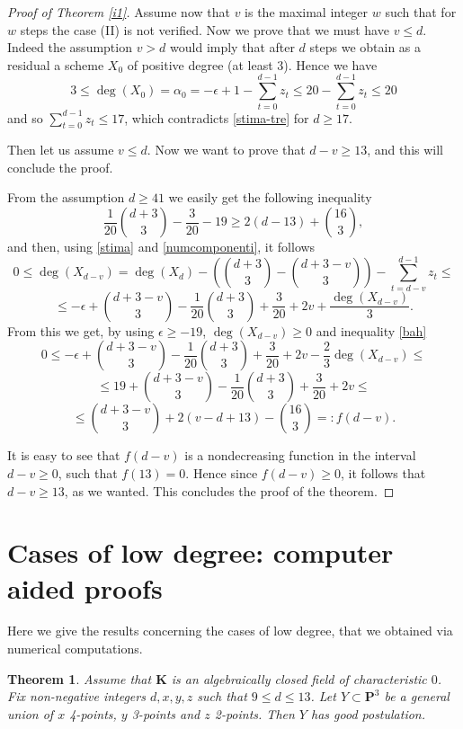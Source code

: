 \documentclass{amsart}
\theoremstyle{plain}
\newtheorem{theorem}{Theorem}
\theoremstyle{definition}
\begin{document}
\begin{proof}[Proof of Theorem \ref{i1}]
\smallskip

Assume now that $v$ is the maximal integer $w$ such
that for $w$ steps the case (II) is not verified.
Now we prove that we must have $v\le d$.
Indeed the assumption $v>d$ would imply that after $d$ steps we obtain
as a residual a scheme $X_0$ of positive degree (at least $3$).
Hence we have
$$3\le \deg(X_{0})= \alpha_0= -\epsilon+1 -\sum_{t=0}^{d-1} z_{t}\le 20
-\sum_{t=0}^{d-1} z_{t}\le20 $$
 and so $\sum_{t=0}^{d-1} z_{t}\le 17$,
which contradicts \eqref{stima-tre} for $d\geq 17$.

Then let us assume $v\le d$.
Now we want to prove that $d-v\ge13$, and this will conclude the proof.

From the assumption $d \ge 41$ we easily get the following inequality
\begin{equation}\label{bah}
 \frac{1}{20}\binom{d+3}{3}-\frac{3}{20} -19 \ge  2(d-13)
 +\binom{16}{3},
\end{equation}
and then, using \eqref{stima} and \eqref{numcomponenti}, it follows
$$0\le\deg(X_{d-v})= \deg(X_d)-
\left(\binom{d+3}{3}-\binom{d+3-v}{3}\right)-\sum_{t=d-v}^{d-1}
z_{t}\le$$
$$\le -\epsilon+\binom{d+3-v}{3} -
   \frac{1}{20}\binom{d+3}{3} +\frac{3}{20}
 +2v+\frac{\deg(X_{d-v})}{3}. $$
From this we get, by using $\epsilon\ge-19$, $\deg(X_{d-v})\ge0$ and inequality \eqref{bah}
$$0\le -\epsilon+\binom{d+3-v}{3} - \frac{1}{20}\binom{d+3}{3} +\frac{3}{20}
 +2v-\frac{2}{3}\deg(X_{d-v})\le $$
$$\le 19+\binom{d+3-v}{3} - \frac{1}{20}\binom{d+3}{3} +\frac{3}{20}
+2v\le$$
$$\le \binom{d+3-v}{3} +2 (v-d+13)-\binom{16}{3}=:f(d-v).$$

It is easy to  see that $f(d-v)$ is a nondecreasing
function in the interval $d-v\geq 0$, such that $f(13)=0$.
Hence since $f(d-v)\geq 0$, it follows that $d-v\geq 13$, as we wanted.
This concludes the proof of the theorem.
\end{proof}

\section{Cases of low degree: computer aided proofs}

Here we give  the results concerning the cases of low degree, that we
obtained via numerical computations.
\begin{theorem}\label{low}
Assume that $\mathbf{K}$ is an algebraically closed field of characteristic $0$.
Fix non-negative integers $d, x, y, z$ such that $9\le d \le13$. Let $Y
\subset {\mathbf P}^3$
be a general union of $x$ 4-points, $y$ 3-points and $z$
2-points. Then $Y$ has good postulation.
\end{theorem}
\end{document}
